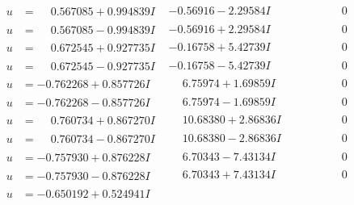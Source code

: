 \documentclass[1p]{elsarticle_modified}
\theoremstyle{definition}
\begin{document}
$$\begin{array}{c|c|c}
 \hline 
\begin{aligned}
u &= \phantom{-}0.567085 + 0.994839 I\end{aligned}
 & -0.56916 - 2.29584 I & \phantom{-0.000000 } 0 \\ \hline\begin{aligned}
u &= \phantom{-}0.567085 - 0.994839 I\end{aligned}
 & -0.56916 + 2.29584 I & \phantom{-0.000000 } 0 \\ \hline\begin{aligned}
u &= \phantom{-}0.672545 + 0.927735 I\end{aligned}
 & -0.16758 + 5.42739 I & \phantom{-0.000000 } 0 \\ \hline\begin{aligned}
u &= \phantom{-}0.672545 - 0.927735 I\end{aligned}
 & -0.16758 - 5.42739 I & \phantom{-0.000000 } 0 \\ \hline\begin{aligned}
u &= -0.762268 + 0.857726 I\end{aligned}
 & \phantom{-}6.75974 + 1.69859 I & \phantom{-0.000000 } 0 \\ \hline\begin{aligned}
u &= -0.762268 - 0.857726 I\end{aligned}
 & \phantom{-}6.75974 - 1.69859 I & \phantom{-0.000000 } 0 \\ \hline\begin{aligned}
u &= \phantom{-}0.760734 + 0.867270 I\end{aligned}
 & \phantom{-}10.68380 + 2.86836 I & \phantom{-0.000000 } 0 \\ \hline\begin{aligned}
u &= \phantom{-}0.760734 - 0.867270 I\end{aligned}
 & \phantom{-}10.68380 - 2.86836 I & \phantom{-0.000000 } 0 \\ \hline\begin{aligned}
u &= -0.757930 + 0.876228 I\end{aligned}
 & \phantom{-}6.70343 - 7.43134 I & \phantom{-0.000000 } 0 \\ \hline\begin{aligned}
u &= -0.757930 - 0.876228 I\end{aligned}
 & \phantom{-}6.70343 + 7.43134 I & \phantom{-0.000000 } 0 \\ \hline\begin{aligned}
u &= -0.650192 + 0.524941 I\end{aligned}

\end{array}$$
\end{document}
